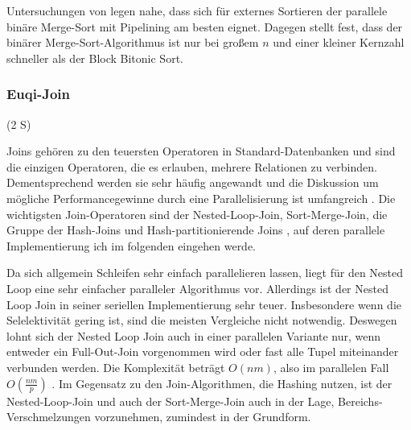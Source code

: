 \documentclass[a4paper,12pt,twoside]{article}
\begin{document}
Untersuchungen von {\textcite{Bitton1984}} legen nahe, dass sich für externes Sortieren der parallele binäre Merge-Sort mit Pipelining am besten eignet. Dagegen stellt {\textcite{Menon1986}} fest, dass der binärer Merge-Sort-Algorithmus ist nur bei großem $n$ und einer kleiner Kernzahl schneller als der Block Bitonic Sort.

\subsubsection{Euqi-Join} (2 S)
\label{Equi Join} 

Joins gehören zu den teuersten Operatoren in Standard-Datenbanken und sind die einzigen Operatoren, die es erlauben, mehrere Relationen zu verbinden. Dementsprechend werden sie sehr häufig angewandt und die Diskussion um mögliche Performancegewinne durch eine Parallelisierung ist umfangreich {\autocite{Richardson1987, Valduriez1984, Schneider1989, DeWitt1985, Lu1994}}. Die wichtigsten Join-Operatoren sind der Nested-Loop-Join, Sort-Merge-Join, die Gruppe der Hash-Joins und Hash-partitionierende Joins {\autocite{Mishra1992, Lu1994}}, auf deren parallele Implementierung ich im folgenden eingehen werde.

Da sich allgemein Schleifen sehr einfach parallelieren lassen, liegt für den Nested Loop eine sehr einfacher paralleler Algorithmus vor. Allerdings ist der Nested Loop Join in seiner seriellen Implementierung sehr teuer. Insbesondere wenn die Selelektivität gering ist, sind die meisten Vergleiche nicht notwendig. Deswegen lohnt sich der Nested Loop Join auch in einer parallelen Variante nur, wenn entweder ein Full-Out-Join vorgenommen wird oder fast alle Tupel miteinander verbunden werden. Die Komplexität beträgt $ O(n m) $, also im parallelen Fall $ O( \frac {n m} {p} )$ {\autocite[S. 72]{Mishra1992}}. Im Gegensatz zu den Join-Algorithmen, die Hashing nutzen, ist der Nested-Loop-Join und auch der Sort-Merge-Join auch in der Lage, Bereichs-Verschmelzungen vorzunehmen, zumindest in der Grundform. 
\end{document}
